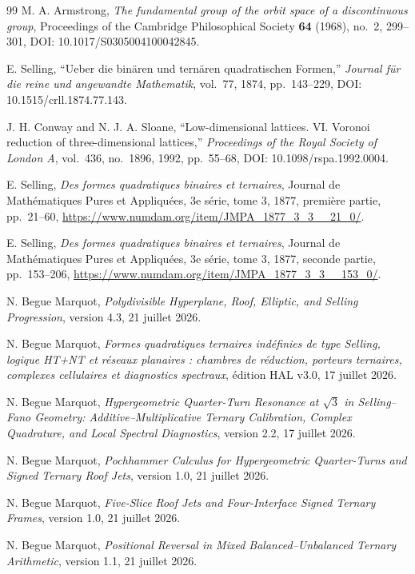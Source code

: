 \documentclass[11pt,a4paper]{article}
\begin{document}
\begin{thebibliography}{99}
M. A. Armstrong, \emph{The fundamental group of the orbit space of a discontinuous group},
Proceedings of the Cambridge Philosophical Society \textbf{64} (1968), no.~2, 299--301, DOI: 10.1017/S0305004100042845.

E. Selling, ``Ueber die binären und ternären quadratischen Formen,''
\emph{Journal für die reine und angewandte Mathematik}, vol.~77, 1874, pp.~143--229,
DOI: 10.1515/crll.1874.77.143.

J. H. Conway and N. J. A. Sloane,
``Low-dimensional lattices. VI. Voronoi reduction of three-dimensional lattices,''
\emph{Proceedings of the Royal Society of London A}, vol.~436, no.~1896, 1992, pp.~55--68,
DOI: 10.1098/rspa.1992.0004.

E. Selling, \emph{Des formes quadratiques binaires et ternaires}, Journal de Mathématiques Pures et Appliquées, 3e série, tome 3, 1877, première partie, pp.~21--60,
\url{https://www.numdam.org/item/JMPA_1877_3_3__21_0/}.

E. Selling, \emph{Des formes quadratiques binaires et ternaires}, Journal de Mathématiques Pures et Appliquées, 3e série, tome 3, 1877, seconde partie, pp.~153--206, \url{https://www.numdam.org/item/JMPA_1877_3_3__153_0/}.

N. Begue Marquot, \emph{Polydivisible Hyperplane, Roof, Elliptic, and Selling Progression}, version 4.3, 21 juillet 2026.

N. Begue Marquot, \emph{Formes quadratiques ternaires indéfinies de type Selling, logique HT+NT et réseaux planaires : chambres de réduction, porteurs ternaires, complexes cellulaires et diagnostics spectraux}, édition HAL v3.0, 17 juillet 2026.

N. Begue Marquot, \emph{Hypergeometric Quarter-Turn Resonance at $\sqrt3$ in Selling--Fano Geometry: Additive--Multiplicative Ternary Calibration, Complex Quadrature, and Local Spectral Diagnostics}, version 2.2, 17 juillet 2026.

N. Begue Marquot, \emph{Pochhammer Calculus for Hypergeometric Quarter-Turns and Signed Ternary Roof Jets}, version 1.0, 21 juillet 2026.

N. Begue Marquot, \emph{Five-Slice Roof Jets and Four-Interface Signed Ternary Frames}, version 1.0, 21 juillet 2026.

N. Begue Marquot, \emph{Positional Reversal in Mixed Balanced--Unbalanced Ternary Arithmetic}, version 1.1, 21 juillet 2026.


\end{thebibliography}
\end{document}
